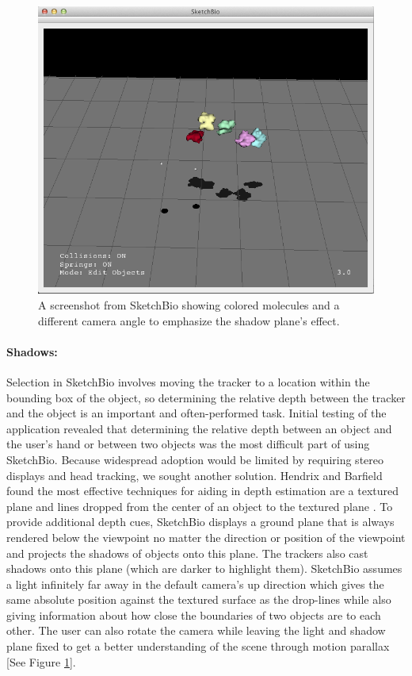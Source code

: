 \documentclass[twocolumn]{bmcart}%
\begin{document}
\begin{figure}[h]
\centering
\includegraphics[width=0.9\columnwidth]{shadow_plane.png}
\caption{A screenshot from SketchBio showing colored molecules and a different camera angle to emphasize the shadow plane's effect.}
\label{fig:shadow_plane}
\end{figure}

\paragraph*{Shadows:}
Selection in SketchBio involves moving the tracker to a location within the bounding box of the object, so determining the relative depth between the tracker and the object is an important and often-performed task.  Initial testing of the application revealed that determining the relative depth between an object and the user's hand or between two objects was the most difficult part of using SketchBio.  Because widespread adoption would be limited by requiring stereo displays and head tracking, we sought another solution.   Hendrix and Barfield found the most effective techniques for aiding in depth estimation are a textured plane and lines dropped from the center of an object to the textured plane \cite{Hendrix1995103}.  To provide additional depth cues, SketchBio displays a ground plane that is always rendered below the viewpoint no matter the direction or position of the viewpoint and projects the shadows of objects onto this plane.  The trackers also cast shadows onto this plane (which are darker to highlight them).  SketchBio assumes a light infinitely far away in the default camera's up direction which gives the same absolute position against the textured surface as the drop-lines while also giving information about how close the boundaries of two objects are to each other.  The user can also rotate the camera while leaving the light and shadow plane fixed to get a better understanding of the scene through motion parallax [See Figure \ref{fig:shadow_plane}].
\end{document}

